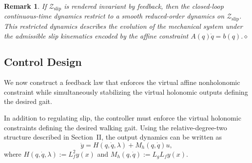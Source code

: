 \documentclass[letterpaper, 10 pt, conference]{ieeeconf}
\newtheorem{remark}{Remark}
\begin{document}
{%


\begin{remark}
If $\mathcal Z_{\mathrm{slip}}$ is rendered invariant by feedback, then the closed-loop continuous-time dynamics restrict to a smooth reduced-order dynamics on $\mathcal Z_{\mathrm{slip}}$. This restricted dynamics describes the evolution of the mechanical system under the admissible slip kinematics encoded by the affine constraint $A(q)\dot q=b(q)$.\hfill$\diamond$
\end{remark}
\subsection{Control Design}

We now construct a feedback law that enforces the virtual affine nonholonomic constraint while simultaneously stabilizing the virtual holonomic outputs defining the desired gait.

In addition to regulating slip, the controller must enforce the virtual holonomic constraints defining the desired walking gait. Using the relative-degree-two structure described in Section~II, the output dynamics can be written as
\begin{equation}
\ddot y=H(q,\dot q,\lambda)+M_h(q,\dot q)u,
\label{eq:y_ddot_sec3}
\end{equation}
where $H(q,\dot q,\lambda):=L_f^2y(x)$ and $M_h(q,\dot q):=L_gL_fy(x)$.

}
\end{document}
